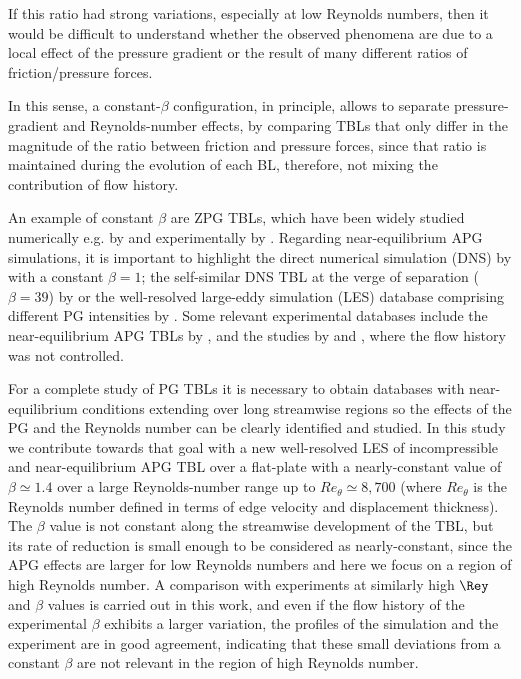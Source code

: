 If this ratio had strong variations, especially at low Reynolds numbers, then it would be difficult to understand whether the observed phenomena are due to a local effect of the pressure gradient or the result of many different ratios of friction/pressure forces.

In this sense, a constant-$\beta$ configuration, in principle, allows to separate pressure-gradient and Reynolds-number effects, by comparing TBLs that only differ in the magnitude of the ratio between friction and pressure forces, since that ratio is maintained during the evolution of each BL, therefore, not mixing the contribution of flow history.

An example of constant $\beta$ are ZPG TBLs, which have been widely studied numerically e.g. by \cite{schlatter_orlu_2012, Sillero_2013pof} and experimentally by  \cite{bailey_2013_JFM, Orlu_Schlatter_exp2013, marusic_2015}. Regarding near-equilibrium APG simulations, it is important to highlight the direct numerical simulation (DNS) by \cite{Kitsios2016} with a constant $\beta=1$; the self-similar DNS TBL at the verge of separation ($\beta=39$) by \cite{Kitsios2017} or the well-resolved large-eddy simulation (LES) database comprising different PG intensities by \cite{bobke2017}. 
Some relevant experimental databases include the near-equilibrium APG TBLs by \cite{skare_krogstad_1994, MTL_expSANMIGUEL}, and the studies by \cite{MONTY2011} and \cite{harun_monty_2013}, where the flow history was not controlled.

For a complete study of PG TBLs it is necessary to obtain databases with near-equilibrium conditions extending over long streamwise regions so the effects of the PG and the Reynolds number can be clearly identified and studied. 
In this study we contribute towards that goal with a new well-resolved LES of incompressible and near-equilibrium APG TBL over a flat-plate with a nearly-constant value of $\beta \simeq 1.4$ over a large Reynolds-number range up to $Re_{\theta} \simeq 8,700$ (where $Re_{\theta}$ is the Reynolds number defined in terms of edge velocity and displacement thickness). The $\beta$ value is not constant along the streamwise development of the TBL, but its rate of reduction is small enough to be considered as nearly-constant, since the APG effects are larger for low Reynolds numbers and here we focus on a region of high Reynolds number. A comparison with experiments at similarly high $\Rey$ and $\beta$ values is carried out in this work, and even if the flow history of the experimental $\beta$ exhibits a larger variation, the profiles of the simulation and the experiment are in good agreement, indicating that these small deviations from a constant $\beta$ are not relevant in the region of high Reynolds number.

